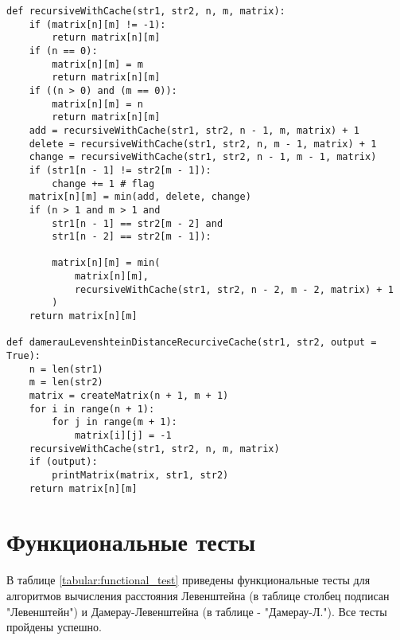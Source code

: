 \begin{lstlisting}[label=lst:rec_dl_cache,caption=Функция нахождения расстояния Дамерау--Левенштейна рекурсивным методом с использованием кеша]
def recursiveWithCache(str1, str2, n, m, matrix):
    if (matrix[n][m] != -1):
        return matrix[n][m]
    if (n == 0):
        matrix[n][m] = m
        return matrix[n][m]
    if ((n > 0) and (m == 0)):
        matrix[n][m] = n
        return matrix[n][m]
    add = recursiveWithCache(str1, str2, n - 1, m, matrix) + 1
    delete = recursiveWithCache(str1, str2, n, m - 1, matrix) + 1
    change = recursiveWithCache(str1, str2, n - 1, m - 1, matrix)
    if (str1[n - 1] != str2[m - 1]):
        change += 1 # flag
    matrix[n][m] = min(add, delete, change)
    if (n > 1 and m > 1 and
        str1[n - 1] == str2[m - 2] and
        str1[n - 2] == str2[m - 1]):

        matrix[n][m] = min(
            matrix[n][m],
            recursiveWithCache(str1, str2, n - 2, m - 2, matrix) + 1
        )
    return matrix[n][m]

def damerauLevenshteinDistanceRecurciveCache(str1, str2, output = True):
    n = len(str1)
    m = len(str2)
    matrix = createMatrix(n + 1, m + 1)
    for i in range(n + 1):
        for j in range(m + 1):
            matrix[i][j] = -1
    recursiveWithCache(str1, str2, n, m, matrix)
    if (output):
        printMatrix(matrix, str1, str2)
    return matrix[n][m]
\end{lstlisting}

\section{Функциональные тесты}
В таблице \ref{tabular:functional_test} приведены функциональные тесты для алгоритмов вычисления расстояния Левенштейна (в таблице столбец подписан "Левенштейн") и Дамерау-Левенштейна (в таблице - "Дамерау-Л."). Все тесты пройдены успешно.


